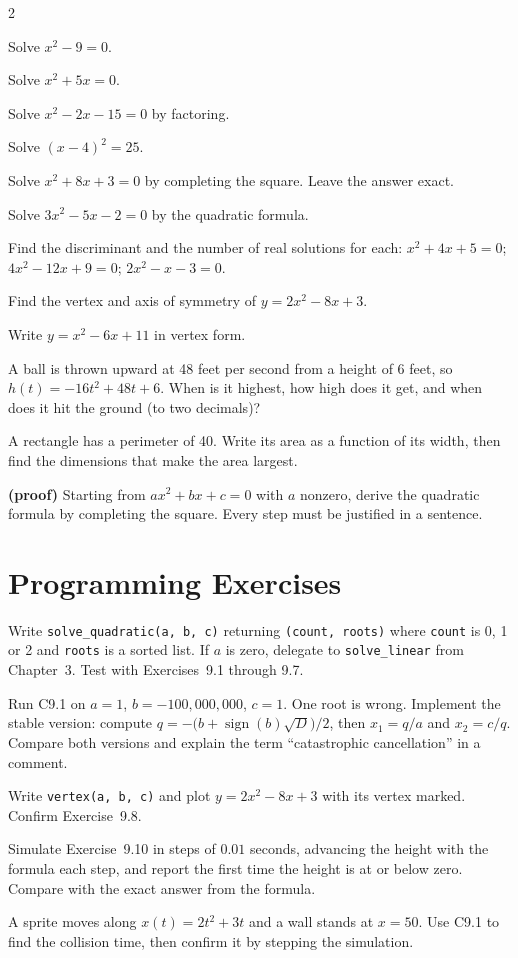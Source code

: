 \begin{multicols}{2}
\begin{exercises}
\item Solve $x^2 - 9 = 0$.
\item Solve $x^2 + 5x = 0$.
\item Solve $x^2 - 2x - 15 = 0$ by factoring.
\item Solve $(x - 4)^2 = 25$.
\item Solve $x^2 + 8x + 3 = 0$ by completing the square. Leave the answer exact.
\item Solve $3x^2 - 5x - 2 = 0$ by the quadratic formula.
\item Find the discriminant and the number of real solutions for each: $x^2 + 4x + 5 = 0$; $4x^2 - 12x + 9 = 0$; $2x^2 - x - 3 = 0$.
\item Find the vertex and axis of symmetry of $y = 2x^2 - 8x + 3$.
\item Write $y = x^2 - 6x + 11$ in vertex form.
\item A ball is thrown upward at 48 feet per second from a height of 6 feet, so $h(t) = -16t^2 + 48t + 6$. When is it highest, how high does it get, and when does it hit the ground (to two decimals)?
\item A rectangle has a perimeter of 40. Write its area as a function of its width, then find the dimensions that make the area largest.
\item \textbf{(proof)} Starting from $ax^2 + bx + c = 0$ with $a$ nonzero, derive the quadratic formula by completing the square. Every step must be justified in a sentence.
\end{exercises}
\end{multicols}

\section{Programming Exercises}

\begin{codeexercises}
\item Write \lstinline!solve_quadratic(a, b, c)! returning \lstinline!(count, roots)! where \lstinline!count! is 0, 1 or 2 and \lstinline!roots! is a sorted list. If $a$ is zero, delegate to \lstinline!solve_linear! from Chapter~3. Test with Exercises~9.1 through 9.7.
\item Run C9.1 on $a = 1$, $b = -100{,}000{,}000$, $c = 1$. One root is wrong. Implement the stable version: compute $q = -\bigl(b + \operatorname{sign}(b)\sqrt{D}\bigr)/2$, then $x_1 = q/a$ and $x_2 = c/q$. Compare both versions and explain the term ``catastrophic cancellation'' in a comment.
\item Write \lstinline!vertex(a, b, c)! and plot $y = 2x^2 - 8x + 3$ with its vertex marked. Confirm Exercise~9.8.
\item Simulate Exercise~9.10 in steps of $0.01$ seconds, advancing the height with the formula each step, and report the first time the height is at or below zero. Compare with the exact answer from the formula.
\item A sprite moves along $x(t) = 2t^2 + 3t$ and a wall stands at $x = 50$. Use C9.1 to find the collision time, then confirm it by stepping the simulation.
\end{codeexercises}
